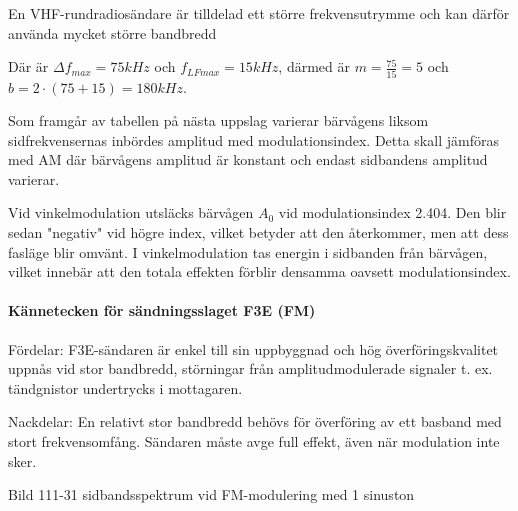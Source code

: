 En VHF-rundradiosändare är tilldelad ett större frekvensutrymme och kan därför använda
mycket större bandbredd

Där är $\Delta f_{max} = 75 kHz$ och $f_{LFmax} =15 kHz$, därmed är $m = \frac{75}{15} = 5$
och $b = 2 \cdot (75 + 15) = 180 kHz$.

Som framgår av tabellen på nästa uppslag varierar bärvågens liksom sidfrekvensernas
inbördes amplitud med modulationsindex. Detta skall jämföras med AM där bärvågens amplitud
är konstant och endast sidbandens amplitud varierar.

Vid vinkelmodulation utsläcks bärvågen $A_0$ vid modulationsindex 2.404. Den blir sedan
"negativ" vid högre index, vilket betyder att den återkommer, men att dess fasläge blir
omvänt. I vinkelmodulation tas energin i sidbanden från bärvågen, vilket innebär att
den totala effekten förblir densamma oavsett modulationsindex.

\paragraph{Kännetecken för sändningsslaget F3E (FM)}

Fördelar: F3E-sändaren är enkel till sin uppbyggnad och hög överföringskvalitet
uppnås vid stor bandbredd, störningar från amplitudmodulerade signaler t. ex. tändgnistor
undertrycks i mottagaren.

Nackdelar: En relativt stor bandbredd behövs för överföring av ett basband med
stort frekvensomfång. Sändaren måste avge full effekt, även när modulation inte sker.

Bild 111-31 sidbandsspektrum vid FM-modulering med 1 sinuston


